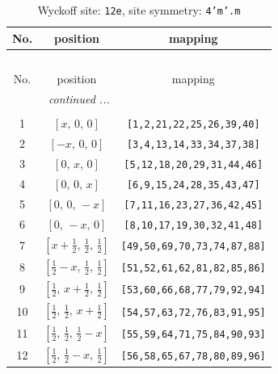 \documentclass[fleqn,8pt]{jsarticle}
\begin{document}
\begin{longtable}{ccc}
\caption{Wyckoff site: {\tt 12e}, site symmetry: {\tt 4'm'.m}}
 \\
 \hline \hline
No. & position & mapping \\ \hline \endfirsthead

\multicolumn{2}{l}{\tablename\ \thetable{}} \\
 \hline \hline
No. & position & mapping \\ \hline \endhead

 \hline \hline
\multicolumn{2}{r}{\footnotesize\it continued ...} \\ \endfoot

 \hline \hline
\multicolumn{2}{r}{} \\ \endlastfoot

1 & $\left[ x,\, 0,\, 0 \right]$ & {\tt [1,2,21,22,25,26,39,40]} \\ \hline
2 & $\left[ - x,\, 0,\, 0 \right]$ & {\tt [3,4,13,14,33,34,37,38]} \\ \hline
3 & $\left[ 0,\, x,\, 0 \right]$ & {\tt [5,12,18,20,29,31,44,46]} \\ \hline
4 & $\left[ 0,\, 0,\, x \right]$ & {\tt [6,9,15,24,28,35,43,47]} \\ \hline
5 & $\left[ 0,\, 0,\, - x \right]$ & {\tt [7,11,16,23,27,36,42,45]} \\ \hline
6 & $\left[ 0,\, - x,\, 0 \right]$ & {\tt [8,10,17,19,30,32,41,48]} \\ \hline
7 & $\left[ x + \frac{1}{2},\, \frac{1}{2},\, \frac{1}{2} \right]$ & {\tt [49,50,69,70,73,74,87,88]} \\ \hline
8 & $\left[ \frac{1}{2} - x,\, \frac{1}{2},\, \frac{1}{2} \right]$ & {\tt [51,52,61,62,81,82,85,86]} \\ \hline
9 & $\left[ \frac{1}{2},\, x + \frac{1}{2},\, \frac{1}{2} \right]$ & {\tt [53,60,66,68,77,79,92,94]} \\ \hline
10 & $\left[ \frac{1}{2},\, \frac{1}{2},\, x + \frac{1}{2} \right]$ & {\tt [54,57,63,72,76,83,91,95]} \\ \hline
11 & $\left[ \frac{1}{2},\, \frac{1}{2},\, \frac{1}{2} - x \right]$ & {\tt [55,59,64,71,75,84,90,93]} \\ \hline
12 & $\left[ \frac{1}{2},\, \frac{1}{2} - x,\, \frac{1}{2} \right]$ & {\tt [56,58,65,67,78,80,89,96]} \\
\end{longtable}
\renewcommand{\arraystretch}{1.2}
\end{document}
